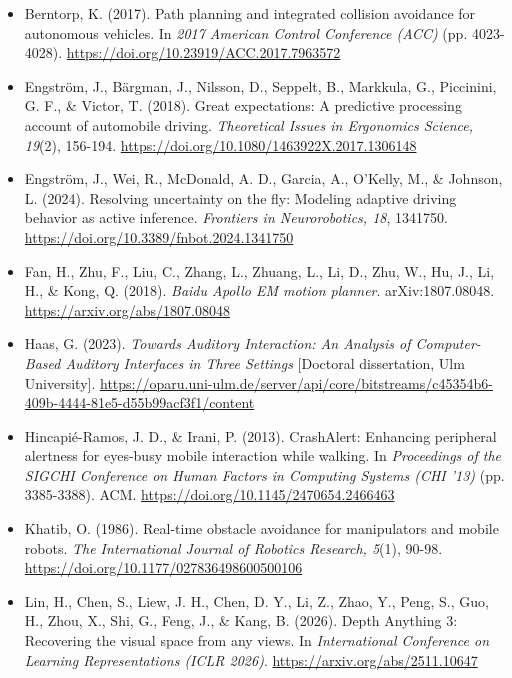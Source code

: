 \documentclass[a4paper]{article}
\begin{document}
\begin{itemize}
	\item Berntorp, K. (2017). Path planning and integrated collision avoidance for autonomous vehicles. In \textit{2017 American Control Conference (ACC)} (pp. 4023-4028). \href{https://doi.org/10.23919/ACC.2017.7963572}{https://doi.org/10.23919/ACC.2017.7963572}
	\item Engström, J., Bärgman, J., Nilsson, D., Seppelt, B., Markkula, G., Piccinini, G. F., \& Victor, T. (2018). Great expectations: A predictive processing account of automobile driving. \textit{Theoretical Issues in Ergonomics Science, 19}(2), 156-194. \href{https://doi.org/10.1080/1463922X.2017.1306148}{https://doi.org/10.1080/1463922X.2017.1306148}
	\item Engström, J., Wei, R., McDonald, A. D., Garcia, A., O'Kelly, M., \& Johnson, L. (2024). Resolving uncertainty on the fly: Modeling adaptive driving behavior as active inference. \textit{Frontiers in Neurorobotics, 18}, 1341750. \href{https://doi.org/10.3389/fnbot.2024.1341750}{https://doi.org/10.3389/fnbot.2024.1341750}
	\item Fan, H., Zhu, F., Liu, C., Zhang, L., Zhuang, L., Li, D., Zhu, W., Hu, J., Li, H., \& Kong, Q. (2018). \textit{Baidu Apollo EM motion planner}. arXiv:1807.08048. \href{https://arxiv.org/abs/1807.08048}{https://arxiv.org/abs/1807.08048}
	\item Haas, G. (2023). \textit{Towards Auditory Interaction: An Analysis of Computer-Based Auditory Interfaces in Three Settings} [Doctoral dissertation, Ulm University]. \href{https://oparu.uni-ulm.de/server/api/core/bitstreams/c45354b6-409b-4444-81e5-d55b99acf3f1/content}{https://oparu.uni-ulm.de/server/api/core/bitstreams/c45354b6-409b-4444-81e5-d55b99acf3f1/content}
	\item Hincapié-Ramos, J. D., \& Irani, P. (2013). CrashAlert: Enhancing peripheral alertness for eyes-busy mobile interaction while walking. In \textit{Proceedings of the SIGCHI Conference on Human Factors in Computing Systems (CHI '13)} (pp. 3385-3388). ACM. \href{https://doi.org/10.1145/2470654.2466463}{https://doi.org/10.1145/2470654.2466463}
	\item Khatib, O. (1986). Real-time obstacle avoidance for manipulators and mobile robots. \textit{The International Journal of Robotics Research, 5}(1), 90-98. \href{https://doi.org/10.1177/027836498600500106}{https://doi.org/10.1177/027836498600500106}
	\item Lin, H., Chen, S., Liew, J. H., Chen, D. Y., Li, Z., Zhao, Y., Peng, S., Guo, H., Zhou, X., Shi, G., Feng, J., \& Kang, B. (2026). Depth Anything 3: Recovering the visual space from any views. In \textit{International Conference on Learning Representations (ICLR 2026)}. \href{https://arxiv.org/abs/2511.10647}{https://arxiv.org/abs/2511.10647}

\end{itemize}
\end{document}
